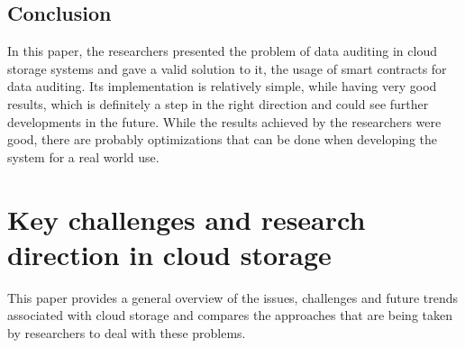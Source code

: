 \documentclass[14pt,oneside]{extreport}
\newcommand*\fpar{\hspace{1ex}}
\begin{document}
\section{Conclusion}
In this paper, the researchers presented the problem of data auditing in cloud storage systems and gave a valid solution to it, the usage of smart contracts for data auditing. Its implementation is relatively simple, while having very good results, which is definitely a step in the right direction and could see further developments in the future. While the results achieved by the researchers were good, there are probably optimizations that can be done when developing the system for a real world use.

\chapter{\Large{Key challenges and research direction in cloud storage \cite{paper5}}}
\vspace{-2em}
\fpar This paper provides a general overview of the issues, challenges and future trends associated with cloud storage and compares the approaches that are being taken by researchers to deal with these problems.
\end{document}
